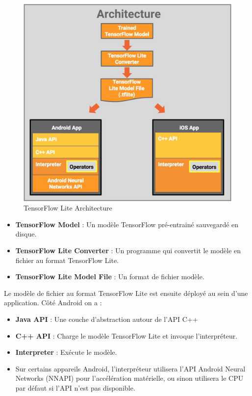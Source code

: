 \documentclass[CDS,UTF8,final]{EPURapport}
\begin{document}
\begin{figure}[h!]
  \includegraphics[width=\linewidth]{images/Tflite_architecture.jpg}
  \caption{TensorFlow Lite Architecture}
  \label{fig:tfliteArchitecture}
\end{figure}

\newpage

\begin{itemize}

\item \textbf{TensorFlow Model} : Un modèle TensorFlow pré-entrainé sauvegardé en disque.
\item \textbf{TensorFlow Lite Converter} : Un programme qui convertit le modèle en fichier au format TensorFlow Lite.
\item \textbf{TensorFlow Lite Model File} : Un format de fichier modèle.

\end{itemize}

Le modèle de fichier au format TensorFlow Lite est ensuite déployé au sein d'une application. Côté Android on a :

\begin{itemize}

\item \textbf{Java API} : Une couche d'abstraction autour de l'API C++
\item \textbf{C++ API} : Charge le modèle TensorFlow Lite et invoque l'interpréteur.
\item \textbf{Interpreter} : Exécute le modèle.
\item Sur certains appareils Android, l'interpréteur utilisera l'API Android Neural Networks (NNAPI) pour l'accélération matérielle, ou sinon utilisera le CPU par défaut si l'API n'est pas disponible.

\end{itemize}
\end{document}
